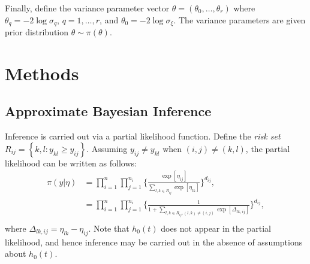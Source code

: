 \documentclass[ba]{imsart}
\begin{document}
Finally, define the variance parameter vector $\theta = (\theta_{0},\ldots,\theta_{r})$ where $\theta_{q} = -2\log\sigma_{q}$, $q = 1,\ldots,r$, and $\theta_{0} = -2\log\sigma_{\xi}$. The variance parameters are given prior distribution $\theta \sim \pi(\theta)$.

\section{Methods}\label{sec:method}


\subsection{Approximate Bayesian Inference}

Inference is carried out via a partial likelihood function. Define the \textit{risk set} $R_{ij} = \left\{k,l : y_{kl} \geq y_{ij}\right\}$. Assuming $y_{ij} \neq y_{kl}$ when $(i,j) \neq (k,l)$, the partial likelihood can be written as follows: 
\begin{equation}\begin{aligned}\label{eqn:partial}
\pi(y|\eta) &= \prod_{i=1}^{n}\prod_{j=1}^{n_{i}} \bigg\{\frac{\exp[\eta_{ij}]}{{\sum_{l,k\in R_{ij}}^{}\exp[\eta_{lk}]}}\bigg \}^{d_{ij}} , \\
&= \prod_{i=1}^{n}\prod_{j=1}^{n_{i}} \bigg\{\frac{1}{{1 + \sum_{l,k\in R_{ij} , (l,k) \neq (i,j)}\exp[\Delta_{lk,ij}]}}\bigg \}^{d_{ij}} , \\
\end{aligned}\end{equation}
where $\Delta_{lk,ij} = \eta_{lk} - \eta_{ij}$. Note that $h_{0}(t)$ does not appear in the partial likelihood, and hence inference may be carried out in the absence of assumptions about $h_{0}(t)$. 
\end{document}
